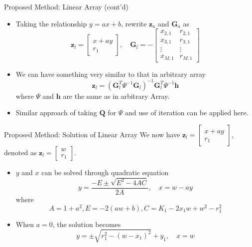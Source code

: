 \documentclass[10pt]{beamer}
\begin{document}
\begin{frame}{Proposed Method: Linear Array (cont'd)}
  \begin{itemize}
    \item Taking the relationship $y=ax+b$, rewrite $\mathbf{z}_a$ and $\mathbf{G}_a$
          as
          $$\mathbf{z}_l=\begin{bmatrix}x+ay\\r_1\end{bmatrix},\quad
            \mathbf{G}_l=-\begin{bmatrix}
                          x_{2,1} & r_{2,1}\\
                          x_{3,1} & r_{3,1}\\
                          \vdots  & \vdots \\
                          x_{M,1} & r_{M,1}\end{bmatrix}$$
    \item We can have something very similar to that in arbitrary array
          $$\mathbf{z}_l=(\mathbf{G}_l^T\Psi^{-1}\mathbf{G}_l)^{-1}\mathbf{G}_l^T\Psi^{-1}\mathbf{h}$$
          where $\Psi$ and $\mathbf{h}$ are the same as in arbitrary Array.
    \item Similar approach of taking $\mathbf{Q}$ for $\Psi$ and use of iteration can be applied here.
  \end{itemize}
\end{frame}

\begin{frame}{Proposed Method: Solution of Linear Array}
  We now have $\mathbf{z}_l=\begin{bmatrix}x+ay\\r_1\end{bmatrix}$,
  denoted as $\mathbf{z}_l=\begin{bmatrix}w\\r_1\end{bmatrix}$.
  \begin{itemize}
    \item $y$ and $x$ can be solved through quadratic equation
          $$y=\frac{-E\pm\sqrt{E^2-4AC}}{2A},\quad x=w-ay$$
          where$$A=1+a^2,E=-2(aw+b),C=K_1-2x_1w+w^2-r_1^2$$
    \item When $a=0$, the solution becomes
          $$y=\pm\sqrt{r_1^2-(w-x_1)^2}+y_1,\quad x=w$$
  \end{itemize}
\end{frame}

\end{document}
